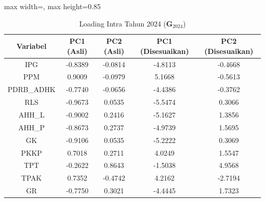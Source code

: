 \begin{table}[H]
\centering
\caption{Loading Intra Tahun 2024 ($\mathbf{G}_{2024}$)} \makeatletter{}\makeatother
\begin{adjustbox}{max width=\textwidth, max height=0.85\textheight}
\begin{tabular}{|c|c|c|c|c|}
\hline
\textbf{Variabel} & \textbf{PC1 (Asli)} & \textbf{PC2 (Asli)} & \textbf{PC1 (Disesuaikan)} & \textbf{PC2 (Disesuaikan)} \\
\hline
IPG & -0.8389 & -0.0814 & -4.8113 & -0.4668 \\
PPM & 0.9009 & -0.0979 & 5.1668 & -0.5613 \\
PDRB\_ADHK & -0.7740 & -0.0656 & -4.4386 & -0.3762 \\
RLS & -0.9673 & 0.0535 & -5.5474 & 0.3066 \\
AHH\_L & -0.9002 & 0.2416 & -5.1627 & 1.3856 \\
AHH\_P & -0.8673 & 0.2737 & -4.9739 & 1.5695 \\
GK & -0.9106 & 0.0535 & -5.2222 & 0.3069 \\
PKKP & 0.7018 & 0.2711 & 4.0249 & 1.5547 \\
TPT & -0.2622 & 0.8643 & -1.5038 & 4.9568 \\
TPAK & 0.7352 & -0.4742 & 4.2162 & -2.7194 \\
GR & -0.7750 & 0.3021 & -4.4445 & 1.7323 \\
\hline
\end{tabular}
\end{adjustbox}
\end{table}